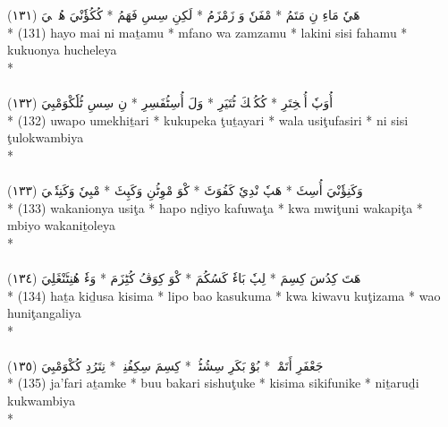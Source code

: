 \documentclass[a4paper, 12pt]{report}
\begin{document}
\begin{center}
\textarabic{(١٣١) \textcolor{mygreen}{هَيٗ مَاءِ نِ مَتَمُ  * مْفَنٗ وَ زَمْزَمُ  * لَكِنِ سِسِ فَهَمُ  * كُكُؤٗنْيَ هُچٖلٖيَ }} \\* 
(131) hayo mai ni maṯamu  * mfano wa zamzamu  * lakini sisi fahamu  * kukuonya hucheleya  \\* 
 \\ 
\\[8mm] 

\textarabic{(١٣٢) \textcolor{mygreen}{أُوَپٗ أُمٖخِتَرِ  * كُكُپٖكَ ٹُتَيَرِ  * وَلَ أُسِٹُفَسِرِ  * نِ سِسِ ٹُلٗكْوَمْبِيَ }} \\* 
(132) uwapo umekhiṯari  * kukupeka ţuṯayari  * wala usiţufasiri  * ni sisi ţulokwambiya  \\* 
 \\ 
\\[8mm] 

\textarabic{(١٣٣) \textcolor{mygreen}{وَكَنِؤٗنْيَ أُسِٹَ  * هَپٗ نْدِيٗ كَفُوَٹَ  * كْوَ مْوِٹُنِ وَكَپِٹَ  * مْبِيٗ وَكَنِتٗلٖيَ }} \\* 
(133) wakanionya usiţa  * hapo nḏiyo kafuwaţa  * kwa mwiţuni wakapiţa  * mbiyo wakaniṯoleya  \\* 
 \\ 
\\[8mm] 

\textarabic{(١٣٤) \textcolor{mygreen}{هَتَ كِدُسَ كِسِمَ  * لِپٗ بَاءٗ كَسُكُمَ  * كْوَ كِوَڤُ كُٹِزَمَ  * وَءٗ هُنِٹَنْڠَلِيَ }} \\* 
(134) haṯa kiḏusa kisima  * lipo bao kasukuma  * kwa kiwavu kuţizama  * wao huniţangaliya  \\* 
 \\ 
\\[8mm] 

\textarabic{(١٣٥) \textcolor{mygreen}{جَعْفَرِ أَتَمْكٖ  * بُوْ بَكَرِ سِشُٹُكٖ  * كِسِمَ سِكِفُنِكٖ  * نِتَرُدِ كُكْوَمْبِيَ }} \\* 
(135) ja'fari aṯamke  * buu bakari sishuţuke  * kisima sikifunike  * niṯaruḏi kukwambiya  \\* 
 \\ 
\\[8mm] 


\end{center}
\end{document}
